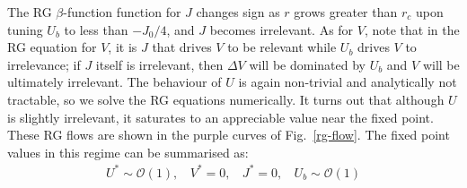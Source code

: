 \documentclass[reprint,superscriptaddress,floatfix]{revtex4-2}
\begin{document}
The RG \(\beta\)-function function for \(J\) changes sign as \(r\) grows greater than \(r_c\) upon tuning \(U_b\) to less than \(-J_0/4\), and \(J\) becomes irrelevant. As for \(V\), note that in the RG equation for \(V\), it is \(J\) that drives \(V\) to be relevant while \(U_b\) drives \(V\) to irrelevance; if \(J\) itself is irrelevant, then \(\Delta V\) will be dominated by \(U_b\) and \(V\) will be ultimately irrelevant. The behaviour of \(U\) is again non-trivial and analytically not tractable, so we solve the RG equations numerically. It turns out that although \(U\) is slightly irrelevant, it saturates to an appreciable value near the fixed point. These RG flows are shown in the purple curves of Fig.~\ref{rg-flow}. The fixed point values in this regime can be summarised as:
\begin{equation}\begin{aligned}
	U^* \sim \mathcal{O}(1), ~ ~ ~ ~ V^* =0, ~ ~ ~ ~ J^* =0, ~ ~ ~ ~ U_b \sim \mathcal{O}(1)
\end{aligned}\end{equation}
\end{document}

